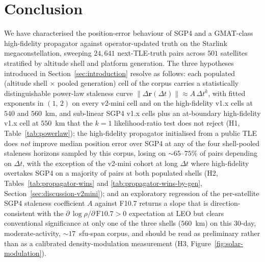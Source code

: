 \documentclass[10pt, letterpaper]{article}
\begin{document}
\section{Conclusion}
\label{sec:conclusion}

We have characterised the position-error behaviour of SGP4 and a
GMAT-class high-fidelity propagator against operator-updated truth on
the Starlink megaconstellation, sweeping $24{,}641$ next-TLE-truth
pairs across $501$ satellites stratified by altitude shell and platform
generation. The three hypotheses introduced in
Section~\ref{sec:introduction} resolve as follows:
each populated (altitude shell $\times$ pooled generation) cell
of the corpus carries a statistically distinguishable power-law
staleness curve $\lVert\Delta\mathbf{r}(\Delta t)\rVert \approx
A\,\Delta t^{k}$, with fitted exponents in $(1,\,2)$ on every
v2-mini cell and on the high-fidelity v1.x cells at $540$ and
$560$~km, and sub-linear SGP4 v1.x cells plus an at-boundary
high-fidelity v1.x cell at $550$~km that the
$k=1$ likelihood-ratio test does not reject (H1,
Table~\ref{tab:powerlaw}); the
high-fidelity propagator initialised from a public TLE does
\emph{not} improve median position error over SGP4 at any of the
four shell-pooled staleness horizons sampled by this corpus, losing
on $\sim 65$--$75\%$ of pairs depending on $\Delta t$, with the
exception of the v2-mini cohort at long $\Delta t$ where
high-fidelity overtakes SGP4 on a majority of pairs at both
populated shells (H2, Tables~\ref{tab:propagator-wins} and
\ref{tab:propagator-wins-by-gen},
Section~\ref{sec:discussion-v2mini}); and an exploratory regression of
the per-satellite SGP4 staleness coefficient $A$ against F10.7
returns a slope that is direction-consistent with the
$\partial\,\log\rho / \partial\,\mathrm{F}10.7 > 0$ expectation at
LEO but clears conventional significance at only one of the three
shells ($560$~km) on this $30$-day, moderate-activity,
$\sim 17$~sfu-span corpus, and should be read as preliminary
rather than as a calibrated density-modulation measurement (H3,
Figure~\ref{fig:solar-modulation}).
\end{document}
